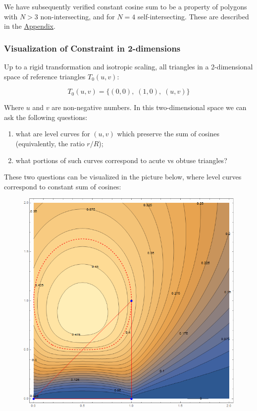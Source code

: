\documentclass[]{article}
\providecommand{\tightlist}{%
  \setlength{\itemsep}{0pt}\setlength{\parskip}{0pt}}
\begin{document}
We have subsequently verified constant cosine sum to be a property of polygons with \(N>3\) non-intersecting, and for \(N=4\) self-intersecting. These are described in the \href{appendices.html}{Appendix}.

\hypertarget{visualization-of-constraint-in-2-dimensions}{%
\subsubsection{Visualization of Constraint in 2-dimensions}\label{visualization-of-constraint-in-2-dimensions}}

Up to a rigid transformation and isotropic scaling, all triangles in a 2-dimensional space of reference triangles \(T_0(u,v)\):

\[
T_0(u,v)=\{(0,0),\;(1,0),\;(u,v)\}
\]

Where \(u\) and \(v\) are non-negative numbers. In this two-dimensional space we can ask the following questions:

\begin{enumerate}
\def\labelenumi{\arabic{enumi}.}
\tightlist
\item
  what are level curves for \((u,v)\) which preserve the sum of cosines (equivalently, the ratio \(r/R\));
\item
  what portions of such curves correspond to acute vs obtuse triangles?
\end{enumerate}

These two questions can be visualized in the picture below, where level curves correspond to constant sum of cosines:

\begin{figure}[H]

{\centering \includegraphics[width=0.5\linewidth]{pics/triangle_arm_ovals} 

}

\end{figure}
\end{document}
